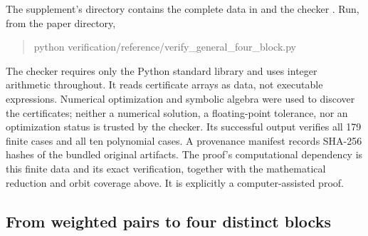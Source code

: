 The supplement's  directory contains the
complete data in  and the
checker . Run, from the paper directory,
\begin{quote}\small\ttfamily
python verification/reference/verify\_general\_four\_block.py
\end{quote}
The checker requires only the Python standard library and uses integer
arithmetic throughout. It reads certificate arrays as data, not executable
expressions. Numerical optimization and symbolic algebra were used to
discover the certificates; neither a numerical solution, a floating-point
tolerance, nor an optimization status is trusted by the checker. Its
successful output verifies all 179 finite cases and all ten polynomial
cases. A provenance manifest records SHA-256 hashes of the bundled
original artifacts. The proof's computational dependency is this finite
data and its exact verification, together with the mathematical reduction
and orbit coverage above. It is explicitly a computer-assisted proof.

\subsection{From weighted pairs to four distinct blocks}

